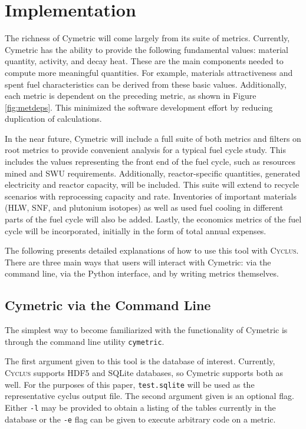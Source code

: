 \documentclass{anstrans}
\newcommand{\cyclus}{\textsc{Cyclus}\xspace}
\newcommand{\code}[1]{{\color{code}\texttt{#1}}}
\begin{document}
\section{Implementation}

The richness of Cymetric will come largely from its suite of metrics. 
Currently, Cymetric has the ability to provide the following fundamental values: 
material quantity, activity, and decay heat. 
These are the main components needed to compute more meaningful quantities.
For example, materials attractiveness and spent fuel characteristics can be derived from these basic values. 
Additionally, each metric is dependent on the preceding metric, as shown in Figure \ref{fig:metdeps}. 
This minimized the software development effort by reducing duplication of calculations. 

In the near future, Cymetric will include a full suite of both metrics and filters 
on root metrics to provide convenient analysis for a typical fuel cycle study. 
This includes the values representing the front end of the fuel cycle, such as 
resources mined and \gls{SWU} requirements. Additionally, reactor-specific 
quantities, generated electricity and reactor capacity, will be included. 
This suite will extend to recycle scenarios with reprocessing capacity and rate. 
Inventories of important materials (\gls{HLW}, \gls{SNF}, and plutonium isotopes) 
as well as used fuel cooling in different parts of the fuel cycle will also be added. 
Lastly, the economics metrics of the fuel cycle will be incorporated, initially in the 
form of total annual expenses. 

The following presents detailed explanations of how to use this tool with \cyclus. 
There are three main ways that users will interact with Cymetric: 
via the command line, via the Python interface, and by writing metrics 
themselves.


\subsection{Cymetric via the Command Line}
The simplest way to become familiarized with the functionality of Cymetric 
is through the command line utility \code{cymetric}. 

The first argument given to this tool is the database of interest. 
Currently, \cyclus supports \gls{HDF5} \cite{folk2011overview} and 
\gls{SQLite} \cite{owens2006definitive} databases, 
so Cymetric supports both as well. For the purposes of this paper, 
\code{test.sqlite} will be used as the representative cyclus output file. 
The second argument given is an optional flag. Either \code{-l} may be provided to obtain 
a listing of the tables currently in the database or the \code{-e} flag 
can be given to execute arbitrary code on a metric. 
\end{document}
